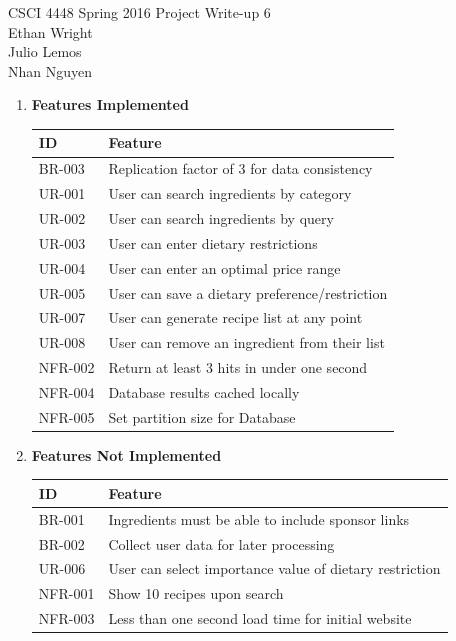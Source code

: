 \documentclass[12pt]{article}
\begin{document}
CSCI 4448 Spring 2016 \hfill Project Write-up 6\\
Ethan Wright \\
Julio Lemos \\
Nhan Nguyen \\

\hrulefill
\begin{enumerate}
  \item \textbf{Features Implemented} 
    \vspace{1cm}
    \\     
    \begin{tabular}{| l | l | } 
      \hline
      \textbf{ID} & \textbf{Feature}  \\ \hline
      BR-003 & Replication factor of 3 for data consistency \\ \hline
      UR-001 & User can search ingredients by category \\ \hline
      UR-002 & User can search ingredients by query \\ \hline
      UR-003 & User can enter dietary restrictions \\ \hline
      UR-004 & User can enter an optimal price range \\ \hline
      UR-005 & User can save a dietary preference/restriction \\ \hline
      UR-007 & User can generate recipe list at any point \\ \hline
      UR-008 & User can remove an ingredient from their list \\ \hline
      NFR-002 & Return at least 3 hits in under one second \\ \hline
      NFR-004 & Database results cached locally \\ \hline
      NFR-005 & Set partition size for Database \\ \hline
    \end{tabular}

  \newpage
  \item \textbf{Features Not Implemented}
    \vspace{1cm}
    \\
    \begin{tabular}{| l | l |}
      \hline
      \textbf{ID} & \textbf{Feature} \\ \hline
      BR-001 & Ingredients must be able to include sponsor links \\ \hline
      BR-002 & Collect user data for later processing \\ \hline
      UR-006 & User can select importance value of dietary restriction \\ \hline
      NFR-001 & Show 10 recipes upon search \\ \hline
      NFR-003 & Less than one second load time for initial website \\ \hline
    \end{tabular} \\


\end{enumerate}
\end{document}
